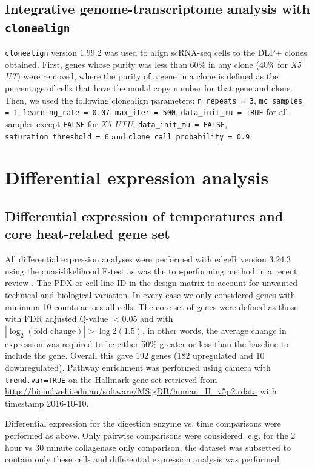 \subsection{Integrative genome-transcriptome analysis with \texttt{clonealign}}
\texttt{clonealign} version 1.99.2 was used to align scRNA-seq cells to the DLP+ clones obtained. First, genes whose purity was less than 60\% in any clone (40\% for \textit{X5 UT}) were removed, where the purity of a gene in a clone  is defined as the percentage of cells that have the modal copy number for that gene and clone. Then, we used the following clonealign parameters: \texttt{n\_repeats = 3}, \texttt{mc\_samples = 1}, \texttt{learning\_rate = 0.07}, \texttt{max\_iter = 500}, \texttt{data\_init\_mu = TRUE} for all samples except \texttt{FALSE} for \textit{X5 UTU}, \texttt{data\_init\_mu = FALSE},
\texttt{saturation\_threshold = 6} and \texttt{clone\_call\_probability = 0.9}.

\section{Differential expression analysis}

\subsection{Differential expression of temperatures and core heat-related gene set} 

All differential expression analyses were performed with edgeR \cite{robinson2010edger} version 3.24.3 using the quasi-likelihood F-test as was the top-performing method in a recent review \cite{soneson2018bias}. The PDX or cell line ID in the design matrix to account for unwanted technical and biological variation. In every case we only considered genes with minimum 10 counts across all cells.
The core set of genes were defined as those with FDR adjusted Q-value $<0.05$ and with $|\log_2(\text{fold change})| > \log2(1.5)$, in other words, the average change in expression was required to be either 50\% greater or less than the baseline to include the gene. Overall this gave 192 genes (182 upregulated and 10 downregulated).
Pathway enrichment was performed using camera \cite{wu2012camera} with \texttt{trend.var=TRUE} on the Hallmark gene set \cite{liberzon2015molecular} retrieved from \url{http://bioinf.wehi.edu.au/software/MSigDB/human\_H\_v5p2.rdata} with timestamp 2016-10-10.

Differential expression for the digestion enzyme vs. time comparisons were performed as above. Only pairwise comparisons were considered, e.g. for the 2 hour vs 30 minute collagenase only comparison, the dataset was subsetted to contain only these cells and differential expression analysis was performed.

